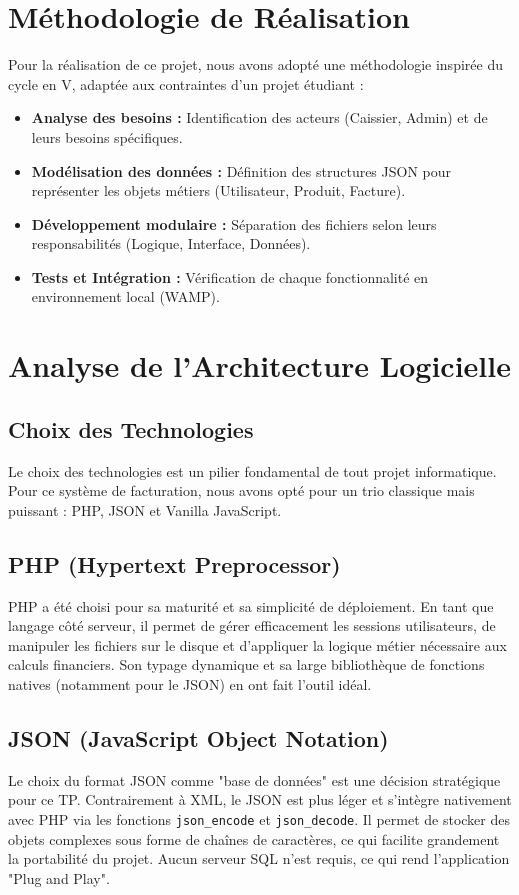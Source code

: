 \documentclass[12pt,a4paper]{report}
\begin{document}
\section{Méthodologie de Réalisation}
Pour la réalisation de ce projet, nous avons adopté une méthodologie inspirée du cycle en V, adaptée aux contraintes d'un projet étudiant :
\begin{itemize}
    \item \textbf{Analyse des besoins :} Identification des acteurs (Caissier, Admin) et de leurs besoins spécifiques.
    \item \textbf{Modélisation des données :} Définition des structures JSON pour représenter les objets métiers (Utilisateur, Produit, Facture).
    \item \textbf{Développement modulaire :} Séparation des fichiers selon leurs responsabilités (Logique, Interface, Données).
    \item \textbf{Tests et Intégration :} Vérification de chaque fonctionnalité en environnement local (WAMP).
\end{itemize}

\section{Analyse de l'Architecture Logicielle}
\subsection{Choix des Technologies}
Le choix des technologies est un pilier fondamental de tout projet informatique. Pour ce système de facturation, nous avons opté pour un trio classique mais puissant : PHP, JSON et Vanilla JavaScript.

\subsection{PHP (Hypertext Preprocessor)}
PHP a été choisi pour sa maturité et sa simplicité de déploiement. En tant que langage côté serveur, il permet de gérer efficacement les sessions utilisateurs, de manipuler les fichiers sur le disque et d'appliquer la logique métier nécessaire aux calculs financiers. Son typage dynamique et sa large bibliothèque de fonctions natives (notamment pour le JSON) en ont fait l'outil idéal.

\subsection{JSON (JavaScript Object Notation)}
Le choix du format JSON comme "base de données" est une décision stratégique pour ce TP. Contrairement à XML, le JSON est plus léger et s'intègre nativement avec PHP via les fonctions \texttt{json\_encode} et \texttt{json\_decode}. Il permet de stocker des objets complexes sous forme de chaînes de caractères, ce qui facilite grandement la portabilité du projet. Aucun serveur SQL n'est requis, ce qui rend l'application "Plug and Play".
\end{document}
